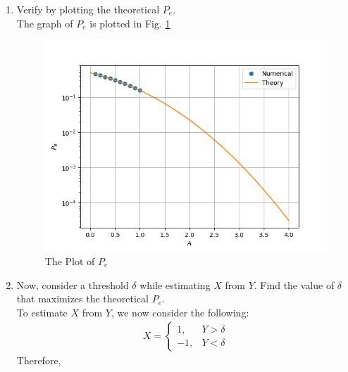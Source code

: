 \documentclass[journal,12pt,twocolumn]{IEEEtran}
\renewcommand\thesection{\arabic{section}}
\begin{document}
\begin{enumerate}[label=\thesection.\arabic*
    ,ref=\thesection.\theenumi]
Similarly, 
\begin{align}
    P_{e|1} = Q_N(A)
\end{align}

Therefore, 
\begin{align}
    P_e &= P_{e|0} \times \pr{X=1} + P_{e|1} \times \pr{X=-1} \\
    &= \frac{1}{2} P_{e|0} + \frac{1}{2} P_{e|1} \\
    &= \frac{1}{2} Q_N(A) + \frac{1}{2} Q_N(A) \\
    &= Q_N(A)
\end{align}


\item
Verify by plotting  the theoretical $P_e$.  
\\
\solution
The graph of $P_e$ is plotted in Fig. \ref{fig:errorgraph}  

\begin{figure}
    \centering
    \includegraphics[width=\columnwidth]{./figures/ErrorGraph.png}
    \caption{The Plot of $P_e$}
    \label{fig:errorgraph}
    \end{figure}



\item Now, consider a threshold $\delta$  while estimating $X$ from $Y$. Find the value of $\delta$ that maximizes the theoretical $P_e$.
\\
\solution
To estimate $X$ from $Y$, we now consider the following:
\begin{align}
    X = 
    \begin{cases}
        1, & Y > \delta \\
        -1, & Y < \delta
    \end{cases}
\end{align}
Therefore,


\end{enumerate}
\end{document}
